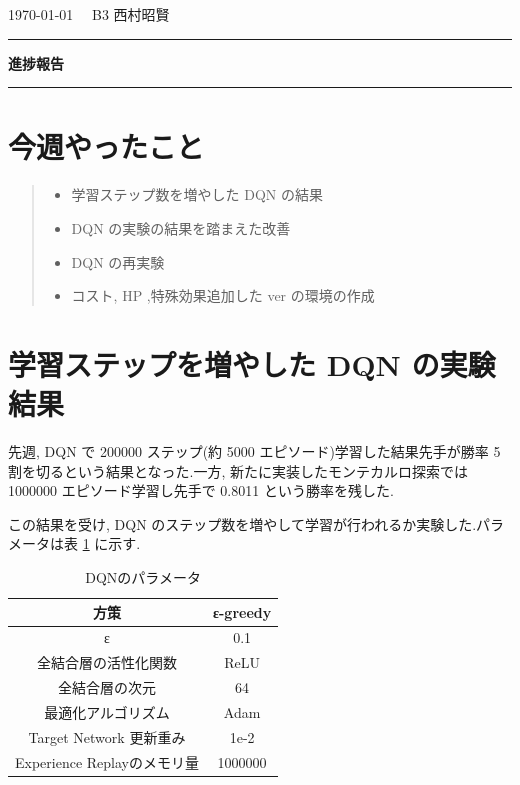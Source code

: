 \documentclass{jarticle}     %
\begin{document}
  \noindent
  \onecolumn
  \hspace{1em}

  \today
  \hfill
  \ \ B3 西村昭賢 

  \vspace{2mm}
  \hrule
  \begin{center}
  {\Large \bf 進捗報告}
  \end{center}
  \hrule
  \vspace{3mm}


\section{今週やったこと}
\begin{quote}
  \begin{itemize}
   \item 学習ステップ数を増やした DQN の結果
   \item DQN の実験の結果を踏まえた改善
   \item DQN の再実験
   \item コスト, HP ,特殊効果追加した ver の環境の作成
  \end{itemize}
 \end{quote}


\section{学習ステップを増やした DQN の実験結果}
先週, DQN で 200000 ステップ(約 5000 エピソード)学習した結果先手が勝率 5 割を切るという結果となった.一方, 新たに実装したモンテカルロ探索では 1000000 エピソード学習し先手で 0.8011 という勝率を残した.\par
この結果を受け, DQN のステップ数を増やして学習が行われるか実験した.パラメータは表 \ref{table:param} に示す.
\begin{table}[h]
  \centering
  \caption{DQNのパラメータ}
  \label{table:param}
  \begin{tabular}{|c||c|}
  \hline
  方策                 & ε-greedy \\ \hline
  ε                      & 0.1      \\ \hline
  全結合層の活性化関数             & ReLU     \\ \hline
  全結合層の次元                & 64       \\ \hline
  最適化アルゴリズム              & Adam     \\ \hline
  Target Network 更新重み               & 1e-2     \\ \hline
  Experience Replayのメモリ量 & 1000000  \\ \hline
  \end{tabular}
  \end{table}
\end{document}
